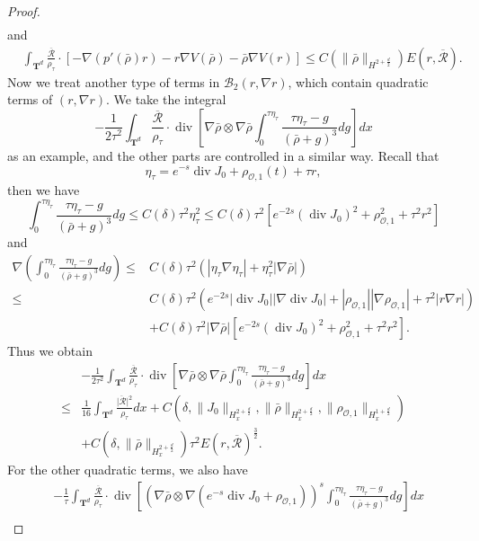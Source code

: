 \documentclass[english]{amsart}
\theoremstyle{plain}
\theoremstyle{definition}
\theoremstyle{remark}
\theoremstyle{plain}
\theoremstyle{plain}
\theoremstyle{plain}
\def\T{{\mathbf T}}%
\DeclareMathOperator{\diver}{div}
\numberwithin{equation}{section}
\begin{document}
\begin{proof}
\begin{align*}
\end{align*}
and
\begin{align*}
&\int_{\T^d} \frac{\overline{\mathcal{R}}}{\rho_\tau}\cdot\left[-\nabla(p'(\bar\rho)r)-r\nabla V(\bar\rho)-\bar\rho\nabla V(r)\right]\leq C(\|\bar\rho\|_{H^{2+\frac{d}{2}}})E(r,\overline{\mathcal{R}}).
\end{align*}
Now we treat another type of terms in $\mathcal{B}_2(r,\nabla r)$, which contain quadratic terms of $(r,\nabla r)$. We take the integral
\[
-\frac{1}{2\tau^2}\int_{\T^d} \frac{\overline{\mathcal{R}}}{\rho_\tau}\cdot\diver\left[\nabla \bar\rho\otimes\nabla \bar\rho\int_0^{\tau \eta_\tau}\frac{\tau \eta_\tau-g}{(\bar\rho+g)^3}dg\right]dx
\]
as an example, and the other parts are controlled in a similar way. Recall that
\[
\eta_\tau=e^{-s}\diver J_0+\rho_{\mathcal{O},1}(t)+\tau r,
\]
then we have
\[
\int_0^{\tau \eta_\tau}\frac{\tau \eta_\tau-g}{(\bar\rho+g)^3}dg\leq C(\delta)\tau^2\eta_\tau^2\leq C(\delta)\tau^2[e^{-2s}(\diver J_0)^2+\rho_{\mathcal{O},1}^2+\tau^2 r^2]
\]
and
\begin{align*}
\nabla\left(\int_0^{\tau \eta_\tau}\frac{\tau \eta_\tau-g}{(\bar\rho+g)^3}dg\right)\leq & C(\delta)\tau^2\left(|\eta_\tau\nabla\eta_\tau|+\eta_\tau^2|\nabla\bar\rho|\right)\\
\leq & C(\delta)\tau^2(e^{-2s}|\diver J_0||\nabla\diver J_0|+|\rho_{\mathcal{O},1}||\nabla \rho_{\mathcal{O},1}|+\tau^2|r\nabla r|)\\
&+C(\delta)\tau^2|\nabla\bar\rho|[e^{-2s}(\diver J_0)^2+\rho_{\mathcal{O},1}^2+\tau^2 r^2].
\end{align*}
Thus we obtain
\begin{align*}
&-\frac{1}{2\tau^2}\int_{\T^d} \frac{\overline{\mathcal{R}}}{\rho_\tau}\cdot\diver\left[\nabla \bar\rho\otimes\nabla \bar\rho\int_0^{\tau \eta_\tau}\frac{\tau \eta_\tau-g}{(\bar\rho+g)^3}dg\right]dx\\
\leq & \frac{1}{16}\int_{\T^d} \frac{\overline{|\mathcal{R}}|^2}{\rho_\tau}dx+C(\delta,\|J_0\|_{H^{2+\frac{d}{2}}_x},\|\bar\rho\|_{H^{2+\frac{d}{2}}_x},\|\rho_{\mathcal{O},1}\|_{H^{1+\frac{d}{2}}_x})\\
&+C(\delta,\|\bar\rho\|_{H^{2+\frac{d}{2}}_x})\tau^2E(r,\overline{\mathcal{R}})^\frac32.
\end{align*}
For the other quadratic terms, we also have
\begin{align*}
&-\frac{1}{\tau}\int_{\T^d} \frac{\overline{\mathcal{R}}}{\rho_\tau}\cdot\diver\left[(\nabla \bar\rho\otimes\nabla(e^{-s}\diver J_0+\rho_{\mathcal{O},1}))^s\int_0^{\tau \eta_\tau}\frac{\tau \eta_\tau-g}{(\bar\rho+g)^3}dg\right]dx\\

\end{align*}
\end{proof}
\end{document}
